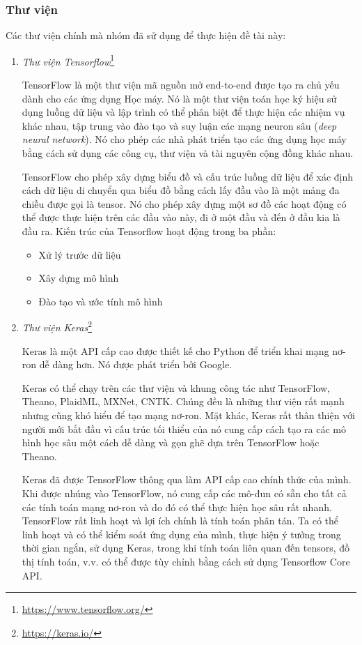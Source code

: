 \subsubsection{Thư viện}
Các thư viện chính mà nhóm đã sử dụng để thực hiện đề tài này:
\begin{enumerate}
    \item \textit{Thư viện Tensorflow}\footnote{\url{https://www.tensorflow.org/}}

          TensorFlow là một thư viện mã nguồn mở end-to-end được tạo ra chủ yếu dành cho các ứng dụng Học máy. Nó là một thư viện toán học ký hiệu sử dụng luồng dữ liệu và lập trình có thể phân biệt để thực hiện các nhiệm vụ khác nhau, tập trung vào đào tạo và suy luận các mạng neuron sâu (\textit{deep neural network}). Nó cho phép các nhà phát triển tạo các ứng dụng học máy bằng cách sử dụng các công cụ, thư viện và tài nguyên cộng đồng khác nhau\cite{webpage16}.

          TensorFlow cho phép xây dựng biểu đồ và cấu trúc luồng dữ liệu để xác định cách dữ liệu di chuyển qua biểu đồ bằng cách lấy đầu vào là một mảng đa chiều được gọi là tensor. Nó cho phép xây dựng một sơ đồ các hoạt động có thể được thực hiện trên các đầu vào này, đi ở một đầu và đến ở đầu kia là đầu ra.
          Kiến trúc của Tensorflow hoạt động trong ba phần:
          \begin{itemize}
              \item Xử lý trước dữ liệu
              \item Xây dựng mô hình
              \item Đào tạo và ước tính mô hình
          \end{itemize}

    \item \textit{Thư viện Keras}\footnote{\url{https://keras.io/}}

          Keras là một API cấp cao được thiết kế cho Python để triển khai mạng nơ-ron dễ dàng hơn. Nó được phát triển bởi Google.

          Keras có thể chạy trên các thư viện và khung công tác như TensorFlow, Theano, PlaidML, MXNet, CNTK. Chúng đều là những thư viện rất mạnh nhưng cũng khó hiểu để tạo mạng nơ-ron. Mặt khác, Keras rất thân thiện với người mới bắt đầu vì cấu trúc tối thiểu của nó cung cấp cách tạo ra các mô hình học sâu một cách dễ dàng và gọn ghẽ dựa trên TensorFlow hoặc Theano.

          Keras đã được TensorFlow thông qua làm API cấp cao chính thức của mình. Khi được nhúng vào TensorFlow, nó cung cấp các mô-đun có sẵn cho tất cả các tính toán mạng nơ-ron và do đó có thể thực hiện học sâu rất nhanh. TensorFlow rất linh hoạt và lợi ích chính là tính toán phân tán. Ta có thể linh hoạt và có thể kiểm soát ứng dụng của mình, thực hiện ý tưởng trong thời gian ngắn, sử dụng Keras, trong khi tính toán liên quan đến tensors, đồ thị tính toán, v.v. có thể được tùy chỉnh bằng cách sử dụng Tensorflow Core API.


\end{enumerate}
